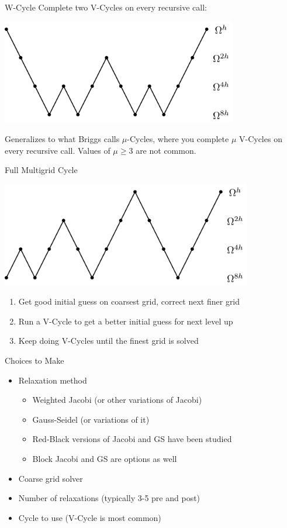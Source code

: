 \documentclass[11pt]{beamer}
\begin{document}
  \begin{frame}{W-Cycle}
    Complete two V-Cycles on every recursive call:
    \begin{center}
      \includegraphics[height=1.8in]{../Graphics/W-Cycle-Graphic.png}
    \end{center}
    Generalizes to what Briggs calls $\mu$-Cycles, where you complete $\mu$ V-Cycles
    on every recursive call. Values of $\mu \geq 3$ are not common.
  \end{frame}
  \begin{frame}{Full Multigrid Cycle}
    \begin{center}
      \includegraphics[height=1.8in]{../Graphics/FMV-Cycle-Graphic.png}
    \end{center}
    \begin{enumerate}
    \item Get good initial guess on coarsest grid, correct next finer grid
    \item Run a V-Cycle to get a better initial guess for next level up
    \item Keep doing V-Cycles until the finest grid is solved
    \end{enumerate}
  \end{frame}
  \begin{frame}{Choices to Make}
    \begin{itemize}
    \item Relaxation method
      \begin{itemize}
      \item Weighted Jacobi (or other variations of Jacobi)
      \item Gauss-Seidel (or variations of it)
      \item Red-Black versions of Jacobi and GS have been studied
      \item Block Jacobi and GS are options as well
      \end{itemize}
    \item Coarse grid solver
    \item Number of relaxations (typically 3-5 pre and post)
    \item Cycle to use (V-Cycle is most common)
    \end{itemize}
  \end{frame}
\end{document}
